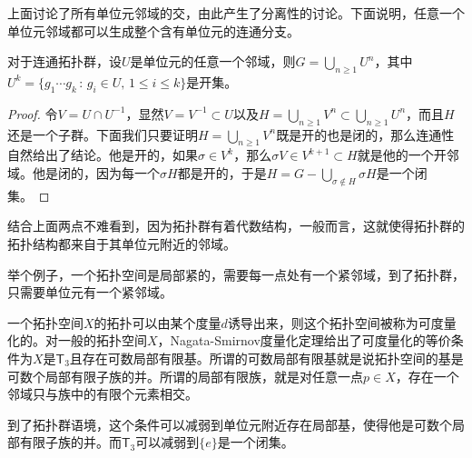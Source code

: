 上面讨论了所有单位元邻域的交，由此产生了分离性的讨论。下面说明，任意一个单位元邻域都可以生成整个含有单位元的连通分支。

\begin{lem}\label{lem:116}
对于连通拓扑群，设$U$是单位元的任意一个邻域，则$G=\bigcup_{n\geq 1}U^n$，其中$U^k=\{g_1\cdots g_k\,:\,g_i\in U,\, 1\leq i \leq k\}$是开集。
\end{lem}

\begin{proof}
令$V=U\cap U^{-1}$，显然$V=V^{-1}\subset U$以及$H=\bigcup_{n\geq 1}V^n\subset \bigcup_{n\geq 1}U^n$，而且$H$还是一个子群。下面我们只要证明$H=\bigcup_{n\geq 1}V^n$既是开的也是闭的，那么连通性自然给出了结论。他是开的，如果$\sigma\in V^k$，那么$\sigma V\in V^{k+1}\subset H$就是他的一个开邻域。他是闭的，因为每一个$\sigma H$都是开的，于是$H=G-\bigcup_{\sigma\notin H}\sigma H$是一个闭集。
\end{proof}

结合上面两点不难看到，因为拓扑群有着代数结构，一般而言，这就使得拓扑群的拓扑结构都来自于其单位元附近的邻域。

举个例子，一个拓扑空间是局部紧的，需要每一点处有一个紧邻域，到了拓扑群，只需要单位元有一个紧邻域。

\begin{para}
一个拓扑空间$X$的拓扑可以由某个度量$d$诱导出来，则这个拓扑空间被称为可度量化的。对一般的拓扑空间$X$，Nagata-Smirnov度量化定理给出了可度量化的等价条件为$X$是$\mathsf{T}_3$且存在可数局部有限基。所谓的可数局部有限基就是说拓扑空间的基是可数个局部有限子族的并。所谓的局部有限族，就是对任意一点$p\in X$，存在一个邻域只与族中的有限个元素相交。

到了拓扑群语境，这个条件可以减弱到单位元附近存在局部基，使得他是可数个局部有限子族的并。而$\mathsf{T}_3$可以减弱到$\{e\}$是一个闭集。
\end{para}


